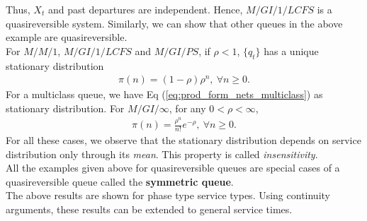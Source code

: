 \documentclass[all-lectures.tex]{subfiles}
\begin{document}
Thus, $X_t$ and past departures are independent. Hence, $M/GI/1/LCFS$ is a quasireversible system. Similarly, we can show that other queues in the above example are quasireversible. \\
\indent For $M/M/1$, $M/GI/1/LCFS$ and $M/GI/PS$, if $\rho < 1$, $\{q_t\}$ has a unique stationary distribution 
\begin{align*}
\pi(n) = (1-\rho)\rho^n,\ \forall n \geq 0.
\end{align*}
For a multiclass queue, we have Eq (\ref{eq:prod_form_nets_multiclass}) as stationary distribution.
For $M/GI/\infty$, for any $0<\rho<\infty$,
\begin{align*}
\pi(n) = \frac{\rho^n}{n!} e^{-\rho}, \ \forall  n \geq 0.
\end{align*}
For all these cases, we observe that the stationary distribution depends on service distribution only through its \textit{mean}. This property is called \textit{insensitivity}.\\
\indent All the examples given above for quasireversible queues are special cases of a quasireversible queue called the \textbf{symmetric queue}. \\
\indent The above results are shown for phase type service types. Using continuity arguments, these results can be extended to general service times. 
\end{document}
